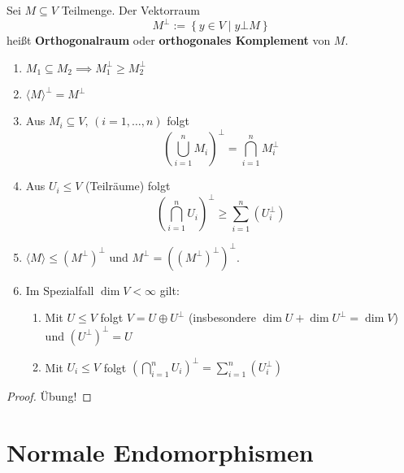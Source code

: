 \documentclass[parskip,a4paper,twoside,DIV15,BCOR12mm]{scrbook}
\begin{document}
\begin{definition}
Sei \(M\subseteq V\) Teilmenge. Der Vektorraum
\[
M^{\bot}:=\left\{y\in V\mid y\bot M\right\}
\]
heißt \textbf{Orthogonalraum} oder \textbf{orthogonales Komplement} von 
\(M\).
\end{definition}
\begin{lemma}
\begin{enumerate}
\item \(M_{1}\subseteq M_{2}\implies M_{1}^{\bot}\geq M_{2}^{\bot}\)
\item \(\langle M\rangle^{\bot}=M^{\bot}\)
\item Aus \(M_{i}\subseteq V,\,(i=1,\ldots,n)\) folgt 
\[
\left(\bigcup_{i=1}^{n}M_{i}\right)^{\bot}=\bigcap_{i=1}^{n}M_{i}^{\bot}
\]
\item Aus \(U_{i}\leq V\) (Teilräume) folgt
\[
\left(\bigcap_{i=1}^{n}U_{i}\right)^{\bot}\geq\sum_{i=1}^{n}{\left(U_{i}^{\bot}\right)}
\]
\item \(\langle M\rangle\leq\left(M^{\bot}\right)^{\bot}\) und
\(M^{\bot}=\left(\left(M^{\bot}\right)^{\bot}\right)^{\bot}\).
\item Im Spezialfall \(\dim V<\infty\) gilt:
\begin{enumerate}
\item Mit \(U\leq V\) folgt \(V=U\oplus U^{\bot}\) (insbesondere \(\dim U+\dim U^{\bot}=\dim V\)) und \(\left(U^{\bot}\right)^{\bot}=U\)
\item Mit \(U_{i}\leq V\) folgt 
\(\left(\bigcap_{i=1}^{n}U_{i}\right)^{\bot}=\sum_{i=1}^{n}{\left(U_{i}^{\bot}\right)}\)
\end{enumerate}
\end{enumerate}
\end{lemma}
\begin{proof}
Übung!
\end{proof}

\chapter{Normale Endomorphismen}
\end{document}
